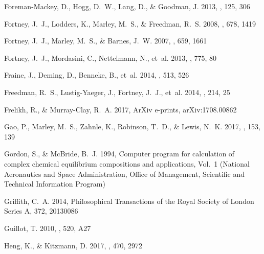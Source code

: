 \documentclass[twocolumn, trackchanges]{aastex61}
\begin{document}
\begin{thebibliography}{}
{Foreman-Mackey}, D., {Hogg}, D.~W., {Lang}, D., \& {Goodman}, J. 2013, \pasp,
  125, 306

{Fortney}, J.~J., {Lodders}, K., {Marley}, M.~S., \& {Freedman}, R.~S. 2008,
  \apj, 678, 1419

{Fortney}, J.~J., {Marley}, M.~S., \& {Barnes}, J.~W. 2007, \apj, 659, 1661

{Fortney}, J.~J., {Mordasini}, C., {Nettelmann}, N., {et~al.} 2013, \apj, 775,
  80

{Fraine}, J., {Deming}, D., {Benneke}, B., {et~al.} 2014, \nat, 513, 526

{Freedman}, R.~S., {Lustig-Yaeger}, J., {Fortney}, J.~J., {et~al.} 2014, \apjs,
  214, 25

{Frelikh}, R., \& {Murray-Clay}, R.~A. 2017, ArXiv e-prints, arXiv:1708.00862

{Gao}, P., {Marley}, M.~S., {Zahnle}, K., {Robinson}, T.~D., \& {Lewis}, N.~K.
  2017, \aj, 153, 139

Gordon, S., \& McBride, B.~J. 1994, Computer program for calculation of complex
  chemical equilibrium compositions and applications, Vol.~1 (National
  Aeronautics and Space Administration, Office of Management, Scientific and
  Technical Information Program)

{Griffith}, C.~A. 2014, Philosophical Transactions of the Royal Society of
  London Series A, 372, 20130086

{Guillot}, T. 2010, \aap, 520, A27

{Heng}, K., \& {Kitzmann}, D. 2017, \mnras, 470, 2972


\end{thebibliography}
\end{document}
